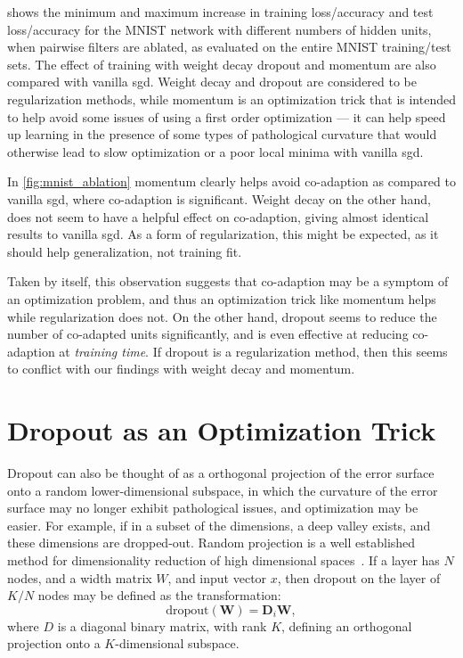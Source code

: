 \documentclass[thesis]{subfiles}
\begin{document}
 shows the minimum and maximum increase in training loss/accuracy and test loss/accuracy for the MNIST network with different numbers of hidden units, when pairwise filters are ablated, as evaluated on the entire MNIST training/test sets. The effect of training with weight decay dropout and momentum are also compared with vanilla \gls{sgd}. Weight decay and dropout are considered to be regularization methods, while momentum is an optimization trick that is intended to help avoid some issues of using a first order optimization --- it can help speed up learning in the presence of some types of pathological curvature that would otherwise lead to slow optimization or a poor local minima with vanilla \gls{sgd}.

In \cref{fig:mnist_ablation} momentum clearly helps avoid co-adaption as compared to vanilla \gls{sgd}, where co-adaption is significant. Weight decay on the other hand, does not seem to have a helpful effect on co-adaption, giving almost identical results to vanilla \gls{sgd}. As a form of regularization, this might be expected, as it should help generalization, not training fit.

Taken by itself, this observation suggests that co-adaption may be a symptom of an optimization problem, and thus an optimization trick like momentum helps while regularization does not. On the other hand, dropout seems to reduce the number of co-adapted units significantly, and is even effective at reducing co-adaption at \emph{training time}. If dropout is a regularization method, then this seems to conflict with our findings with weight decay and momentum.

\section{Dropout as an Optimization Trick}\label{dropoutasopttrick}
Dropout can also be thought of as a orthogonal projection of the error surface onto a random lower-dimensional subspace, in which the curvature of the error surface may no longer exhibit pathological issues, and optimization may be easier. For example, if in a subset of the dimensions, a deep valley exists, and these dimensions are dropped-out. Random projection is a well established method for dimensionality reduction of high dimensional spaces~\citep{kaski1998dimensionality,fodor2002survey}.
If a layer has $N$ nodes, and a width matrix $W$, and input vector $x$, then dropout on the layer of $K/N$ nodes may be defined as the transformation:
\begin{equation}
    \textrm{dropout}(\mathbf{W}) = \mathbf{D}_{i} \mathbf{W},
\end{equation}
where $D$ is a diagonal binary matrix, with rank $K$, defining an orthogonal projection onto a $K$-dimensional subspace. 
\end{document}
